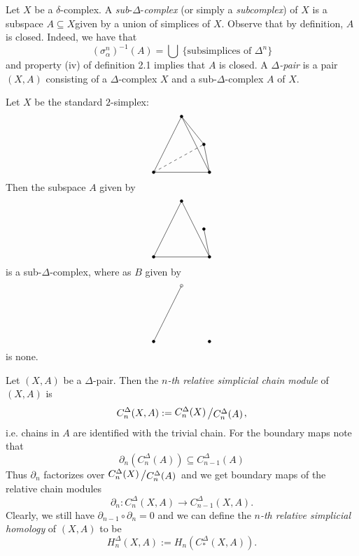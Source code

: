 \documentclass[11pt]{book}
\numberwithin{dummy}{section}
\theoremstyle{nonumberbreak}
\newenvironment{defin}[1][]{\ifthenelse{\equal{#1}{}}{\definition}{\definition[#1]}\rm}{\enddefinition}
\newenvironment{ex}[1][]{\ifthenelse{\equal{#1}{}}{\example}{\example[#1]}\rm}{\endexample}
\newcommand{\la}{\longrightarrow}
\newcommand{\slant}[2]{{\raisebox{.1em}{$#1$}\left/\raisebox{-.1em}{$#2$}\right.}}
\begin{document}
\begin{spacing}{1.4}
Let $X$ be a $\delta$-complex. A \textit{sub}-$\Delta$-\textit{complex} (or simply a \textit{subcomplex}) of $X$ is a subspace $A\subseteq X$given by a union of simplices of $X$. Observe that by definition, $A$ is closed. Indeed, we have that 
$$(\sigma_{\alpha}^n)^{-1}(A) = \bigcup \ \{ \textrm{subsimplices of } \Delta^n \}$$
and property (iv) of definition 2.1 implies that $A$ is closed. A $\Delta$\textit{-pair} is a pair $(X,A)$ consisting of a $\Delta$-complex $X$ and a sub-$\Delta$-complex $A$ of $X$.


\begin{ex}
Let $X$ be the standard $2$-simplex:
$$ 
\begin{tikzpicture}
\draw[fill=black] (0.05,0) arc(0:360:0.05cm);
\draw[fill=black] (2.05,0) arc(0:360:0.05cm);
\draw[fill=black] (1.05,2) arc(0:360:0.05cm);
\draw (0,0) -- (2,0) -- (1,2) -- (0,0);
\draw[fill=black] (1.85,1) arc (0:360:0.05cm);
\draw (2,0) -- (1.8,1) -- (1,2);
\draw[dashed] (0,0) -- (1.8,1);
\end{tikzpicture}
$$
Then the subspace $A$ given by
$$ 
\begin{tikzpicture}
\draw[fill=black] (0.05,0) arc(0:360:0.05cm);
\draw[fill=black] (2.05,0) arc(0:360:0.05cm);
\draw[fill=black] (1.05,2) arc(0:360:0.05cm);
\draw (0,0) -- (2,0) -- (1,2) -- (0,0);
\draw[fill=black] (1.85,1) arc (0:360:0.05cm);
\draw (2,0) -- (1.8,1);
\end{tikzpicture}
$$
is a sub-$\Delta$-complex, where as $B$ given by 
$$
\begin{tikzpicture}
\draw[fill=black] (0.05,0) arc(0:360:0.05cm);
\draw[fill=black] (2.05,0) arc(0:360:0.05cm);
\draw[] (1.05,2) arc(0:360:0.05cm);
\draw (0,0) --(1,2);
\end{tikzpicture}
$$
is none.


\end{ex}


\begin{defin}
Let $(X,A)$ be a $\Delta$-pair. Then the $n$\textit{-th relative simplicial chain module} of $(X,A)$ is
$$C_n^{\Delta}(X,A) := \slant{C_n^{\Delta}(X)}{C_n^{\Delta}(A)},$$
i.e. chains in $A$ are identified with the trivial chain. For the boundary maps note that 
$$\partial_n(C_n^{\Delta}(A)) \subseteq C_{n-1}^{\Delta}(A)$$
Thus $\partial_n$ factorizes over $\slant{C_n^{\Delta}(X)}{C_n^{\Delta}(A)}$ and we get boundary maps of the relative chain modules
$$\partial_n: C_n^{\Delta}(X,A) \la C_{n-1}^{\Delta}(X,A).$$
Clearly, we still have $\partial_{n-1} \circ \partial_n=0$ and we can define the $n$\textit{-th relative simplicial homology} of $(X,A)$ to be 
$$H_n^{\Delta}(X,A) := H_n(C_*^{\Delta}(X,A)).$$


\end{defin}
\end{spacing}
\end{document}
